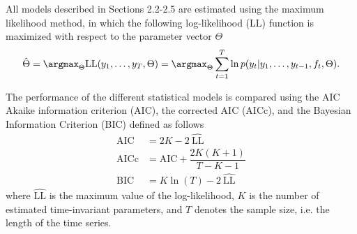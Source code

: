 All models described in Sections 2.2-2.5 are estimated using the maximum likelihood method, in which the following log-likelihood (LL) function is maximized with respect to the parameter vector $\Theta$
\begin{equation*}
    \hat{\Theta} = \argmax_{\Theta} \text{LL}(y_1,\dots, y_T, \Theta) = \argmax_{\Theta} \sum_{t=1}^{T} \ln p(y_t|y_1, \dots, y_{t-1}, f_t, \Theta).
\end{equation*}

The performance of the different statistical models is compared using the AIC Akaike information criterion (AIC), the corrected AIC (AICc), and the  Bayesian Information Criterion (BIC) defined as follows
\begin{align*}
    \text{AIC} &= 2K-2 \ \hat{\text{LL}} \\
    \text{AICc} &= \text{AIC} + \dfrac{2K(K+1)}{T-K-1} \\
    \text{BIC} & = K \ln(T) - 2 \ \hat{\text{LL}}
\end{align*}
where $\hat{\text{LL}}$ is the maximum value of the log-likelihood, $K$ is the number of estimated time-invariant parameters, and $T$ denotes the sample size, i.e. the length of the time series. 